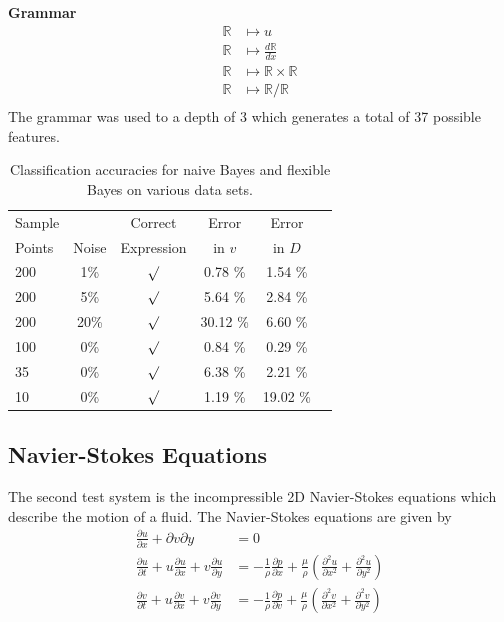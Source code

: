 \documentclass{article}
\begin{document}
\textbf{Grammar}
\begin{align*}
  \mathbb{R} &\mapsto u \quad\\
  \mathbb{R} &\mapsto \frac{d\mathbb{R}}{dx}\\
  \mathbb{R} &\mapsto \mathbb{R} \times \mathbb{R} \\
  \mathbb{R} &\mapsto \mathbb{R} / \mathbb{R} \\
\end{align*}
The grammar was used to a depth of 3 which generates a total of 37 possible features.

\begin{table}[t]
\caption{Classification accuracies for naive Bayes and flexible
Bayes on various data sets.}
\label{sample-table}
\vskip 0.15in
\begin{center}
\begin{small}
\begin{sc}
\begin{tabular}{lccccr}
\toprule
Sample &  & Correct & Error & Error\\
Points & Noise & Expression & in $v$ & in $D$\\
\midrule
200 & 1\% & $\surd$ & 0.78 \% & 1.54 \% \\
200 & 5\% & $\surd$ & 5.64 \% & 2.84 \% \\
200 & 20\% & $\surd$ & 30.12 \% & 6.60 \% \\
100 & 0\% & $\surd$ & 0.84 \% & 0.29 \% \\
35 & 0\% & $\surd$ & 6.38 \% & 2.21 \% \\
10 & 0\% & $\surd$ & 1.19 \% & 19.02 \% \\
\bottomrule
\end{tabular}
\end{sc}
\end{small}
\end{center}
\vskip -0.1in
\end{table}


\subsection{Navier-Stokes Equations}
The second test system is the incompressible 2D Navier-Stokes equations which describe the motion of a fluid. The Navier-Stokes equations are given by
\begin{align}
  \frac{\partial u}{\partial x} + \partial{v}{\partial y} &= 0 \\
  \frac{\partial u }{\partial t} + u \frac{\partial u }{\partial x} + v \frac{\partial u }{\partial y} &= - \frac{1}{\rho} \frac{\partial p}{\partial x} + \frac{\mu}{\rho}\left( \frac{\partial^2 u}{\partial x^2} + \frac{\partial^2 u}{\partial y^2} \right) \\
\frac{\partial v }{\partial t} + u \frac{\partial v }{\partial x} + v \frac{\partial v }{\partial y} &= - \frac{1}{\rho} \frac{\partial p}{\partial v} + \frac{\mu}{\rho}\left( \frac{\partial^2 v}{\partial x^2} + \frac{\partial^2 v}{\partial y^2} \right)
\end{align}
\end{document}

